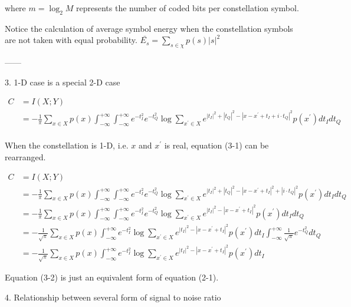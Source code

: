 \documentclass[12pt,a4paper]{article}
\begin{document}
where $m=\log_2M$ represents the number of coded bits per constellation symbol.

Notice the calculation of average symbol energy when the constellation symbols are not taken with equal probability.
$\bar{E_s}=\sum_{s\in \chi}p(s)|s|^2$

------



3. 1-D case is a special 2-D case 

\begin{equation}
    \begin{split}
        C&=I(X;Y)\\
        &=-\frac{1}{\pi}\sum_{x\in X}p(x)\int_{-\infty}^{+\infty}\int_{-\infty}^{+\infty}e^{-t_I^2}e^{-t_Q^2}\log{\sum_{x^\prime\in X}e^{|t_I|^2+|t_Q|^2-|x-x^\prime+t_I+i\cdot t_Q|^2}p(x^\prime)}dt_{I}dt_{Q}\\
        \end{split}\tag{3-1}
\end{equation}

When the constellation is 1-D, i.e. $x$ and $x^\prime$ is real, equation (3-1) can be rearranged.

\begin{equation}
    \begin{split}
        C&=I(X;Y)\\
        &=-\frac{1}{\pi}\sum_{x\in X}p(x)\int_{-\infty}^{+\infty}\int_{-\infty}^{+\infty}e^{-t_I^2}e^{-t_Q^2}\log{\sum_{x^\prime\in X}e^{|t_I|^2+|t_Q|^2-|x-x^\prime+t_I|^2+|i\cdot t_Q|^2}p(x^\prime)}dt_{I}dt_{Q}\\
        &=-\frac{1}{\pi}\sum_{x\in X}p(x)\int_{-\infty}^{+\infty}\int_{-\infty}^{+\infty}e^{-t_I^2}e^{-t_Q^2}\log{\sum_{x^\prime\in X}e^{|t_I|^2-|x-x^\prime+t_I|^2}p(x^\prime)}dt_{I}dt_{Q}\\
        &=-\frac{1}{\sqrt{\pi}}\sum_{x\in X}p(x)\int_{-\infty}^{+\infty}e^{-t_I^2}\log{\sum_{x^\prime\in X}e^{|t_I|^2-|x-x^\prime+t_I|^2}p(x^\prime)}dt_{I}\int_{-\infty}^{+\infty}\frac{1}{\sqrt{\pi}}e^{-t_Q^2}dt_{Q}\\
        &=-\frac{1}{\sqrt{\pi}}\sum_{x\in X}p(x)\int_{-\infty}^{+\infty}e^{-t_I^2}\log{\sum_{x^\prime\in X}e^{|t_I|^2-|x-x^\prime+t_I|^2}p(x^\prime)}dt_{I}
        \end{split}\tag{3-2}
\end{equation}

Equation (3-2) is just an equivalent form of equation (2-1).




4. Relationship between several form of signal to noise ratio
\end{document}
